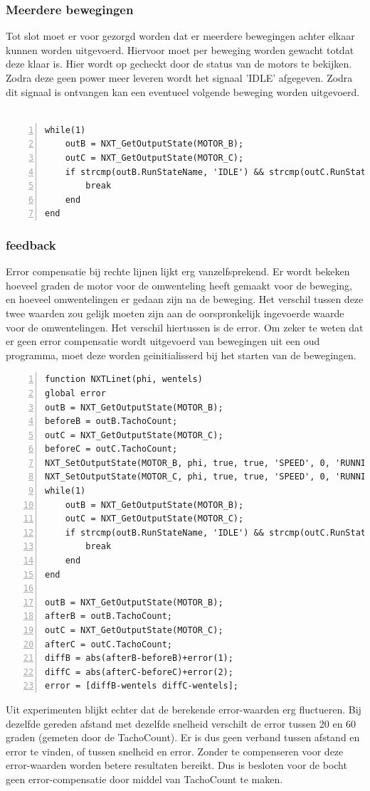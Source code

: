 \documentclass[a4paper]{article}
\begin{document}
\subsubsection{Meerdere bewegingen}
Tot slot moet er voor gezorgd worden dat er meerdere bewegingen achter elkaar kunnen worden uitgevoerd. Hiervoor moet per beweging worden gewacht totdat deze klaar is. Hier wordt op gecheckt door de status van de motors te bekijken. Zodra deze geen power meer leveren wordt het signaal 'IDLE' afgegeven. Zodra dit signaal is ontvangen kan een eventueel volgende beweging worden uitgevoerd.
\\\\
\begin{lstlisting}[caption=Meerdere moves, label=lst:moves, numbers=left]
while(1)
    outB = NXT_GetOutputState(MOTOR_B);
    outC = NXT_GetOutputState(MOTOR_C);
    if strcmp(outB.RunStateName, 'IDLE') && strcmp(outC.RunStateName, 'IDLE')
        break
    end
end
\end{lstlisting}
\subsubsection{feedback}
Error compensatie bij rechte lijnen lijkt erg vanzelfsprekend. Er wordt bekeken hoeveel graden de motor voor de omwenteling heeft gemaakt voor de beweging, en hoeveel omwentelingen er gedaan zijn na de beweging. Het verschil tussen deze twee waarden zou gelijk moeten zijn aan de oorspronkelijk ingevoerde waarde voor de omwentelingen. Het verschil hiertussen is de error. Om zeker te weten dat er geen error compensatie wordt uitgevoerd van bewegingen uit een oud programma, moet deze worden geinitialisserd bij het starten van de bewegingen. 
\begin{lstlisting}[caption=Error compensatie bij een lijn, label=lst:lineerror, numbers=left]
function NXTLinet(phi, wentels)
global error
outB = NXT_GetOutputState(MOTOR_B);
beforeB = outB.TachoCount;
outC = NXT_GetOutputState(MOTOR_C);
beforeC = outC.TachoCount;
NXT_SetOutputState(MOTOR_B, phi, true, true, 'SPEED', 0, 'RUNNING', wentels-error(1), 'dontreply');
NXT_SetOutputState(MOTOR_C, phi, true, true, 'SPEED', 0, 'RUNNING', wentels-error(2), 'dontreply');
while(1)
    outB = NXT_GetOutputState(MOTOR_B);
    outC = NXT_GetOutputState(MOTOR_C);
    if strcmp(outB.RunStateName, 'IDLE') && strcmp(outC.RunStateName, 'IDLE')
        break
    end
end

outB = NXT_GetOutputState(MOTOR_B);
afterB = outB.TachoCount;
outC = NXT_GetOutputState(MOTOR_C);
afterC = outC.TachoCount;
diffB = abs(afterB-beforeB)+error(1);
diffC = abs(afterC-beforeC)+error(2);
error = [diffB-wentels diffC-wentels];

\end{lstlisting}
Uit experimenten blijkt echter dat de berekende error-waarden erg fluctueren. Bij dezelfde gereden afstand met dezelfde snelheid verschilt de error tussen 20 en 60 graden (gemeten door de TachoCount). Er is dus geen verband tussen afstand en error te vinden, of tussen snelheid en error. Zonder te compenseren voor deze error-waarden worden betere resultaten bereikt. Dus is besloten voor de bocht geen error-compensatie door middel van TachoCount te maken.
\end{document}
